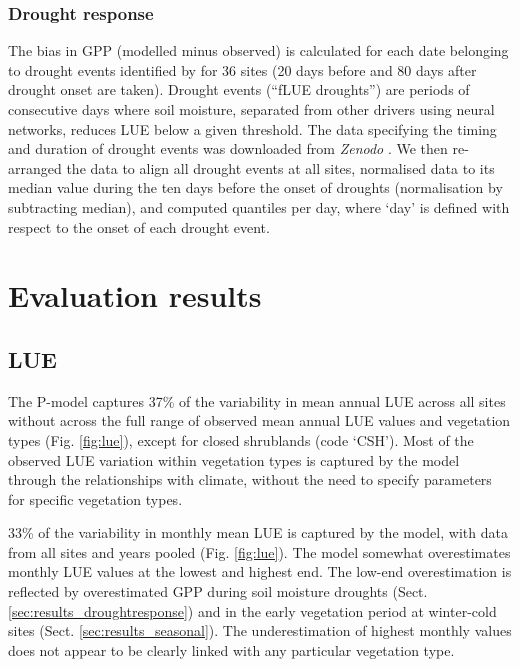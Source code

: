 \documentclass[gmd, manuscript]{copernicus}
\begin{document}
\subsubsection{Drought response}
\label{sec:droughtresponse}
The bias in GPP (modelled minus observed) is calculated for each date belonging to drought events identified by \citet{stocker18newphyt} for 36 sites (20 days before and 80 days after drought onset are taken). Drought events (``fLUE droughts'') are periods of consecutive days where soil moisture, separated from other drivers using neural networks, reduces LUE below a given threshold. The data specifying the timing and duration of drought events was downloaded from \textit{Zenodo} \citep{flue}. We then re-arranged the data to align all drought events at all sites, normalised data to its median value during the ten days before the onset of droughts (normalisation by subtracting median), and computed quantiles per day, where `day' is defined with respect to the onset of each drought event.

\section{Evaluation results}
\label{sec:results}

\subsection{LUE}

The P-model captures 37\% of the variability in mean annual LUE across all sites without across the full range of observed mean annual LUE values and vegetation types (Fig. \ref{fig:lue}), except for closed shrublands (code `CSH'). Most of the observed LUE variation within vegetation types is captured by the model through the relationships with climate, without the need to specify parameters for specific vegetation types. 

33\% of the variability in monthly mean LUE is captured by the model, with data from all sites and years pooled (Fig. \ref{fig:lue}). The model somewhat overestimates monthly LUE values at the lowest and highest end. The low-end overestimation is reflected by overestimated GPP during soil moisture droughts (Sect. \ref{sec:results_droughtresponse}) and in the early vegetation period at winter-cold sites (Sect. \ref{sec:results_seasonal}). The underestimation of highest monthly values does not appear to be clearly linked with any particular vegetation type.
\end{document}
